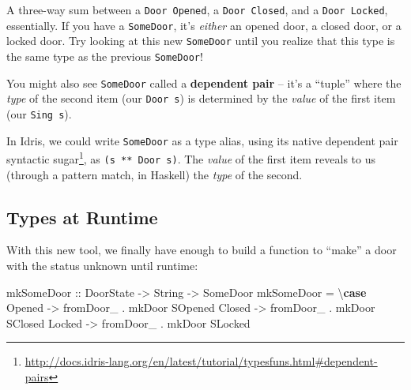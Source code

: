 \documentclass[]{article}
\newenvironment{Shaded}{}{}
\newcommand{\KeywordTok}[1]{\textcolor[rgb]{0.00,0.44,0.13}{\textbf{#1}}}
\newcommand{\DataTypeTok}[1]{\textcolor[rgb]{0.56,0.13,0.00}{#1}}
\newcommand{\StringTok}[1]{\textcolor[rgb]{0.25,0.44,0.63}{#1}}
\newcommand{\OtherTok}[1]{\textcolor[rgb]{0.00,0.44,0.13}{#1}}
\newcommand{\FunctionTok}[1]{\textcolor[rgb]{0.02,0.16,0.49}{#1}}
\newcommand{\NormalTok}[1]{#1}
\renewcommand{\href}[2]{#2\footnote{\url{#1}}}
\begin{document}
A three-way sum between a \texttt{Door\ \textquotesingle{}Opened}, a
\texttt{Door\ \textquotesingle{}Closed}, and a
\texttt{Door\ \textquotesingle{}Locked}, essentially. If you have a
\texttt{SomeDoor}, it's \emph{either} an opened door, a closed door, or a locked
door. Try looking at this new \texttt{SomeDoor} until you realize that this type
is the same type as the previous \texttt{SomeDoor}!

You might also see \texttt{SomeDoor} called a \textbf{dependent pair} -- it's a
``tuple'' where the \emph{type} of the second item (our \texttt{Door\ s}) is
determined by the \emph{value} of the first item (our \texttt{Sing\ s}).

In Idris, we could write \texttt{SomeDoor} as a type alias, using its native
\href{http://docs.idris-lang.org/en/latest/tutorial/typesfuns.html\#dependent-pairs}{dependent
pair syntactic sugar}, as \texttt{(s\ **\ Door\ s)}. The \emph{value} of the
first item reveals to us (through a pattern match, in Haskell) the \emph{type}
of the second.

\subsection{Types at Runtime}\label{types-at-runtime}

With this new tool, we finally have enough to build a function to ``make'' a
door with the status unknown until runtime:

\begin{Shaded}
\begin{Highlighting}[]
\OtherTok{mkSomeDoor ::} \DataTypeTok{DoorState} \OtherTok{->} \DataTypeTok{String} \OtherTok{->} \DataTypeTok{SomeDoor}
\NormalTok{mkSomeDoor }\FunctionTok{=}\NormalTok{ \textbackslash{}}\KeywordTok{case}
    \DataTypeTok{Opened} \OtherTok{->}\NormalTok{ fromDoor_ }\FunctionTok{.}\NormalTok{ mkDoor }\DataTypeTok{SOpened}
    \DataTypeTok{Closed} \OtherTok{->}\NormalTok{ fromDoor_ }\FunctionTok{.}\NormalTok{ mkDoor }\DataTypeTok{SClosed}
    \DataTypeTok{Locked} \OtherTok{->}\NormalTok{ fromDoor_ }\FunctionTok{.}\NormalTok{ mkDoor }\DataTypeTok{SLocked}
\end{Highlighting}
\end{Shaded}

\begin{Shaded}
\end{Shaded}
\end{document}
